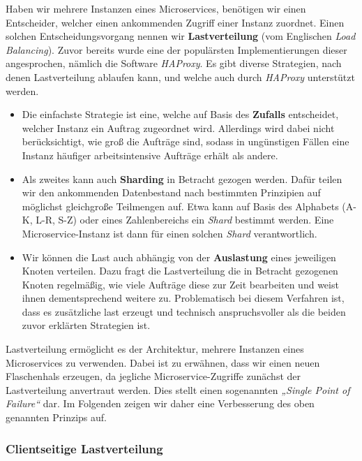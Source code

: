 Haben wir mehrere Instanzen eines Microservices, benötigen wir einen Entscheider, welcher einen ankommenden Zugriff einer Instanz zuordnet. Einen solchen Entscheidungsvorgang nennen wir \textbf{Lastverteilung} (vom Englischen \textit{Load Balancing}). Zuvor bereits wurde eine der populärsten Implementierungen dieser angesprochen, nämlich die Software \textit{HAProxy}. Es gibt diverse Strategien, nach denen Lastverteilung ablaufen kann, und welche auch durch \textit{HAProxy} unterstützt werden.

\begin{itemize}
	\item Die einfachste Strategie ist eine, welche auf Basis des \textbf{Zufalls} entscheidet, welcher Instanz ein Auftrag zugeordnet wird. Allerdings wird dabei nicht berücksichtigt, wie groß die Aufträge sind, sodass in ungünstigen Fällen eine Instanz häufiger arbeitsintensive Aufträge erhält als andere.
	
	\item Als zweites kann auch \textbf{Sharding} in Betracht gezogen werden. Dafür teilen wir den ankommenden Datenbestand nach bestimmten Prinzipien auf möglichst gleichgroße Teilmengen auf. Etwa kann auf Basis des Alphabets (A-K, L-R, S-Z) oder eines Zahlenbereichs ein \textit{Shard} bestimmt werden. Eine Microservice-Instanz ist dann für einen solchen \textit{Shard} verantwortlich.
	
	\item Wir können die Last auch abhängig von der \textbf{Auslastung} eines jeweiligen Knoten verteilen. Dazu fragt die Lastverteilung die in Betracht gezogenen Knoten regelmäßig, wie viele Aufträge diese zur Zeit bearbeiten und weist ihnen dementsprechend weitere zu. Problematisch bei diesem Verfahren ist, dass es zusätzliche last erzeugt und technisch anspruchsvoller als die beiden zuvor erklärten Strategien ist.
\end{itemize}

Lastverteilung ermöglicht es der Architektur, mehrere Instanzen eines Microservices zu verwenden. Dabei ist zu erwähnen, dass wir einen neuen Flaschenhals erzeugen, da jegliche Microservice-Zugriffe zunächst der Lastverteilung anvertraut werden. Dies stellt einen sogenannten \textit{„Single Point of Failure“} dar. Im Folgenden zeigen wir daher eine Verbesserung des oben genannten Prinzips auf.

\subsubsection{Clientseitige Lastverteilung}

